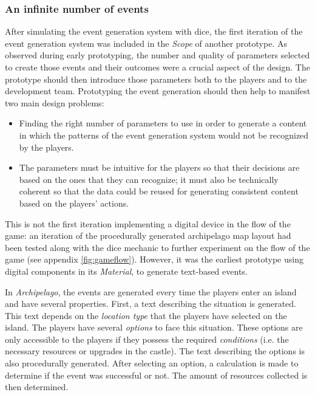 \subsubsection{An infinite number of events}
After simulating the event generation system with dice, the first iteration of the event generation system was included in the \textit{Scope} of another prototype. As observed during early prototyping, the number and quality of parameters selected to create those events and their outcomes were a crucial aspect of the design. The prototype should then introduce those parameters both to the players and to the development team. Prototyping the event generation should then help to manifest two main design problems:
\begin{itemize}
\item Finding the right number of parameters to use in order to generate a content in which the patterns of the event generation system would not be recognized by the players.
\item The parameters must be intuitive for the players so that their decisions are based on the ones that they can recognize; it must also be technically coherent so that the data could be reused for generating consistent content based on the players' actions.
\end{itemize}
This is not the first iteration implementing a digital device in the flow of the game: an iteration of the procedurally generated archipelago map layout had been tested along with the dice mechanic to further experiment on the flow of the game (see appendix \ref{fig:gameflow}). However, it was the earliest prototype using digital components in its \textit{Material}, to generate text-based events.

In \textit{Archipelago}, the events are generated every time the players enter an island and have several properties. First, a text describing the situation is generated. This text depends on the \textit{location type} that the players have selected on the island. The players have several \textit{options} to face this situation. These options are only accessible to the players if they possess the required \textit{conditions} (i.e. the necessary resources or upgrades in the castle). The text describing the options is also procedurally generated. After selecting an option, a calculation is made to determine if the event was successful or not. The amount of resources collected is then determined. 
